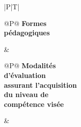 {\begin{tabular}[t]{|P|T|}
	\hline
{ \setlength{\extrarowheight}{0pt}
	\begin{tabular}[t]{@{}P@{}}
	\textcolor{exempleC}{\bfseries Formes} \\
	\textcolor{exempleC}{\bfseries pédagogiques} \\
	\end{tabular}
}
&  \\
\hline
{ \setlength{\extrarowheight}{0pt}
	\begin{tabular}[t]{@{}P@{}}
	\textcolor{exempleC}{\bfseries Modalités} \\
	\textcolor{exempleC}{\bfseries d'évaluation} \\
	\textcolor{exempleC}{\bfseries assurant l'acquisition} \\
	\textcolor{exempleC}{\bfseries du niveau de} \\
	\textcolor{exempleC}{\bfseries compétence visée} \\
	\end{tabular}
}
&  \\
\hline
\end{tabular}
}